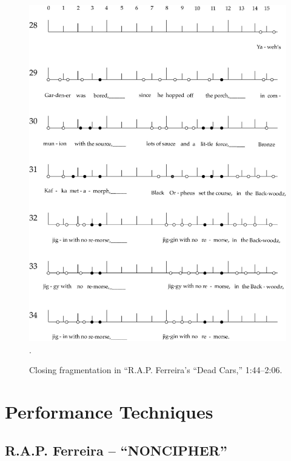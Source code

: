     \begin{figure}[!htp]
        \centering
        \includegraphics{images/figures/chp 03/144206deadcarsendfrag.pdf}
        .\caption{Closing fragmentation in ``R.A.P. Ferreira's ``Dead Cars,'' 1:44--2:06.}
        \label{fig:roryclosingfrag}
    \end{figure}


\newpage
\section{Performance Techniques}
\subsection*{\centering R.A.P. Ferreira -- ``NONCIPHER''}
    

